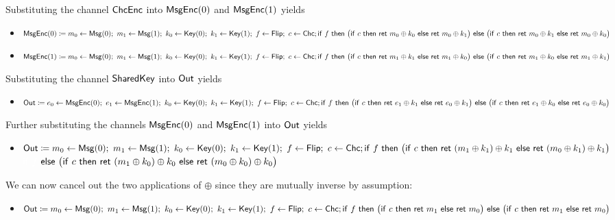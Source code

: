 \noindent Substituting the channel $\mathsf{ChcEnc}$ into $\mathsf{MsgEnc}(0)$ and $\mathsf{MsgEnc}(1)$ yields
\begin{itemize}
\item $\mathsf{MsgEnc}(0) \coloneqq m_0 \leftarrow \mathsf{Msg}(0); \ m_1 \leftarrow \mathsf{Msg}(1); \ k_0 \leftarrow \mathsf{Key}(0); \ k_1 \leftarrow \mathsf{Key}(1); \ f \leftarrow \mathsf{Flip}; \ c \leftarrow \mathsf{Chc}; \\ \mathsf{if} \ f \ \mathsf{then} \ \big(\mathsf{if} \ c \ \mathsf{then} \ \mathsf{ret} \ m_0 \oplus k_0 \ \mathsf{else} \ \mathsf{ret} \ m_0 \oplus k_1\big) \ \mathsf{else} \ \big(\mathsf{if} \ c \ \mathsf{then} \ \mathsf{ret} \ m_0 \oplus k_1 \ \mathsf{else} \ \mathsf{ret} \ m_0 \oplus k_0\big)$
\item $\mathsf{MsgEnc}(1) \coloneqq m_0 \leftarrow \mathsf{Msg}(0); \ m_1 \leftarrow \mathsf{Msg}(1); \ k_0 \leftarrow \mathsf{Key}(0); \ k_1 \leftarrow \mathsf{Key}(1); \ f \leftarrow \mathsf{Flip}; \ c \leftarrow \mathsf{Chc}; \\ \mathsf{if} \ f \ \mathsf{then} \ \big(\mathsf{if} \ c \ \mathsf{then} \ \mathsf{ret} \ m_1 \oplus k_1 \ \mathsf{else} \ \mathsf{ret} \ m_1 \oplus k_0\big) \ \mathsf{else} \ \big(\mathsf{if} \ c \ \mathsf{then} \ \mathsf{ret} \ m_1 \oplus k_0 \ \mathsf{else} \ \mathsf{ret} \ m_1 \oplus k_1\big)$
\end{itemize}
Substituting the channel $\mathsf{SharedKey}$ into $\mathsf{Out}$ yields
\begin{itemize}
\item $\mathsf{Out} \coloneqq e_0 \leftarrow \mathsf{MsgEnc}(0); \ e_1 \leftarrow \mathsf{MsgEnc}(1); \ k_0 \leftarrow \mathsf{Key}(0); \ k_1 \leftarrow \mathsf{Key}(1); \ f \leftarrow \mathsf{Flip}; \ c \leftarrow \mathsf{Chc}; \\ \mathsf{if} \ f \ \mathsf{then} \ \big(\mathsf{if} \ c \ \mathsf{then} \ \mathsf{ret} \ e_1 \oplus k_1 \ \mathsf{else} \ \mathsf{ret} \ e_0 \oplus k_1\big) \ \mathsf{else} \ \big(\mathsf{if} \ c \ \mathsf{then} \ \mathsf{ret} \ e_1 \oplus k_0 \ \mathsf{else} \ \mathsf{ret} \ e_0 \oplus k_0\big)$
\end{itemize}
Further substituting the channels $\mathsf{MsgEnc}(0)$ and $\mathsf{MsgEnc}(1)$ into $\mathsf{Out}$ yields
\begin{itemize}
\item $\Out \coloneqq m_0 \leftarrow \Msg(0); \ m_1 \leftarrow \Msg(1); \ k_0 \leftarrow \Key(0); \ k_1 \leftarrow \Key(1); \ f \leftarrow \Flip; \ c \leftarrow \Chc; \\ \mathsf{if} \ f \ \mathsf{then} \ \big(\ifte{c}{\ret{(m_1 \oplus k_1)} \oplus k_1}{\ret{(m_0 \oplus k_1)} \oplus k_1}\big)$ \\ ${\color{white} \mathsf{if} \ f \ } \mathsf{else} \ \big(\ifte{c}{\ret{(m_1 \oplus k_0)} \oplus k_0}{\ret{(m_0 \oplus k_0)} \oplus k_0}\big)$
\end{itemize}
We can now cancel out the two applications of $\oplus$ since they are mutually inverse by assumption:
\begin{itemize}
\item $\mathsf{Out} \coloneqq m_0 \leftarrow \mathsf{Msg}(0); \ m_1 \leftarrow \mathsf{Msg}(1); \ k_0 \leftarrow \mathsf{Key}(0); \ k_1 \leftarrow \mathsf{Key}(1); \ f \leftarrow \mathsf{Flip}; \ c \leftarrow \mathsf{Chc}; \\ \mathsf{if} \ f \ \mathsf{then} \ \big(\mathsf{if} \ c \ \mathsf{then} \ \mathsf{ret} \ m_1 \ \mathsf{else} \ \mathsf{ret} \ m_0\big) \ \mathsf{else} \ \big(\mathsf{if} \ c \ \mathsf{then} \ \mathsf{ret} \ m_1 \ \mathsf{else} \ \mathsf{ret} \ m_0\big)$
\end{itemize}
